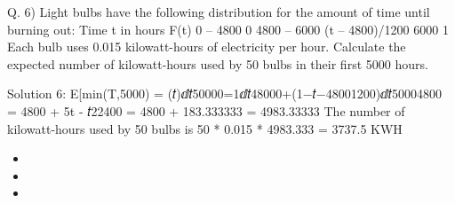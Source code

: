 \documentclass[a4paper,12pt]{article}
\begin{document}


Q. 6)
Light bulbs have the following distribution for the amount of time until burning out:
Time t in hours
F(t)
0 – 4800
0
4800 – 6000
(t – 4800)/1200
6000
1
Each bulb uses 0.015 kilowatt-hours of electricity per hour.
Calculate the expected number of kilowatt-hours used by 50 bulbs in their first 5000 hours.


Solution 6:
E[min(T,5000) = (𝑡)ⅆ𝑡50000=\int1ⅆ𝑡48000+\int(1−𝑡−48001200)ⅆ𝑡50004800 
= 4800 + 5t - 𝑡22400
= 4800 + 183.333333
= 4983.33333 
The number of kilowatt-hours used by 50 bulbs is 50 * 0.015 * 4983.333 = 3737.5 KWH



\begin{itemize}
\item 
\item 
\item 
\end{itemize}
\end{document}
